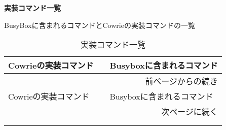  
\begin{center}
\large{\textbf{実装コマンド一覧}}
\end{center}

BusyBoxに含まれるコマンドとCowrieの実装コマンドの一覧
 
\begin{longtable}{p{64mm}p{64mm}}
  \caption{実装コマンド一覧}
  \label{table:command} \\
  \hline
  Cowrieの実装コマンド　& Busyboxに含まれるコマンド \\ \hline\hline
  \endfirsthead
  \multicolumn{2}{r}{前ページからの続き} \\ \hline
  Cowrieの実装コマンド　& Busyboxに含まれるコマンド \\ \hline\hline
  \endhead
  \hline
  \multicolumn{2}{r}{次ページに続く} \\
  \endfoot
  \hline
  \multicolumn{2}{r}{以上} \\
  \endlastfoot


\end{longtable}
